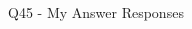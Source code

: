 \begin{frame}{Q45 - My Answer Responses}
\begin{multicols}{4}
    \begin{minipage}{\linewidth}
    \RaggedRight\textbf{\tiny {}} \\ 
    \vspace{4.00pt}
    \end{minipage}
    \vspace{10pt}

    \end{multicols}
\end{frame}

